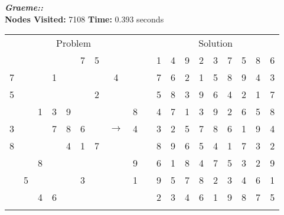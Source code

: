 \documentclass{article}
\begin{document}
\small\emph{\textbf{Graeme::}}\\ \textbf{Nodes Visited:} 7108 \textbf{Time:} 0.393 seconds\\
\begin{tabular}{||c|c|c||c|c|c||c|c|c|| c ||c|c|c||c|c|c||c|c|c||}
  \cmidrule{1-9} \cmidrule{11-19}
  \multicolumn{9}{|c|}{Problem} &                   & \multicolumn{9}{|c|}{Solution}   \\\cmidrule{1-9} \cmidrule{11-19} \morecmidrules \cmidrule{1-9} \cmidrule{11-19}
  &   &   &   &   & 7 & 5 &   &   &  & 1 & 4 & 9 & 2 & 3 & 7 & 5 & 8 & 6\\\cmidrule{1-9} \cmidrule{11-19}
7 &   &   & 1 &   &   &   & 4 &   &  & 7 & 6 & 2 & 1 & 5 & 8 & 9 & 4 & 3\\\cmidrule{1-9} \cmidrule{11-19}
5 &   &   &   &   &   & 2 &   &   &  & 5 & 8 & 3 & 9 & 6 & 4 & 2 & 1 & 7\\\cmidrule{1-9} \cmidrule{11-19} \morecmidrules \cmidrule{1-9} \cmidrule{11-19}
  &   & 1 & 3 & 9 &   &   &   & 8 &  & 4 & 7 & 1 & 3 & 9 & 2 & 6 & 5 & 8\\\cmidrule{1-9} \cmidrule{11-19}
3 &   &   & 7 & 8 & 6 &   & $\rightarrow$  & 4 &  & 3 & 2 & 5 & 7 & 8 & 6 & 1 & 9 & 4\\\cmidrule{1-9} \cmidrule{11-19}
8 &   &   &   & 4 & 1 & 7 &   &   &  & 8 & 9 & 6 & 5 & 4 & 1 & 7 & 3 & 2\\\cmidrule{1-9} \cmidrule{11-19} \morecmidrules \cmidrule{1-9} \cmidrule{11-19}
  &   & 8 &   &   &   &   &   & 9 &  & 6 & 1 & 8 & 4 & 7 & 5 & 3 & 2 & 9\\\cmidrule{1-9} \cmidrule{11-19}
  & 5 &   &   &   & 3 &   &   & 1 &  & 9 & 5 & 7 & 8 & 2 & 3 & 4 & 6 & 1\\\cmidrule{1-9} \cmidrule{11-19}
  &   & 4 & 6 &   &   &   &   &   &  & 2 & 3 & 4 & 6 & 1 & 9 & 8 & 7 & 5\\\cmidrule{1-9} \cmidrule{11-19} \morecmidrules \cmidrule{1-9} \cmidrule{11-19}
 \end{tabular}
\newpage
\end{document}
